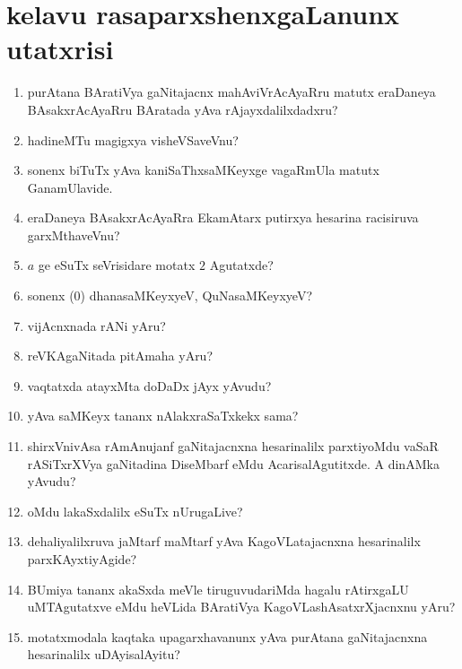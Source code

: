 \chapter{kelavu rasaparxshenxgaLanunx utatxrisi}\label{chap20}

\begin{enumerate}
  \renewcommand{\labelenumi}{\rm(\theenumi)}
    \itemsep=2pt
\item purAtana BAratiVya gaNitajacnx mahAviVrAcAyaRru matutx eraDaneya BAsakxrAcAyaRru BAratada yAva rAjayxdalilxdadxru?

\item hadineMTu magigxya visheVSaveVnu?

\item sonenx biTuTx yAva kaniSaThxsaMKeyxge vagaRmUla matutx GanamUlavide.

\item eraDaneya BAsakxrAcAyaRra EkamAtarx putirxya hesarina racisiruva garxMthaveVnu?
  
\item $a$ ge eSuTx seVrisidare motatx $2$ Agutatxde?
  
\item sonenx ($0$) dhanasaMKeyxyeV, QuNasaMKeyxyeV?
  
\item vijAcnxnada rANi yAru?
  
\item reVKAgaNitada pitAmaha yAru?
   
\item vaqtatxda atayxMta doDaDx jAyx yAvudu?
  
\item yAva saMKeyx tananx nAlakxraSaTxkekx sama?

\item shirxVnivAsa rAmAnujanf gaNitajacnxna hesarinalilx parxtiyoMdu vaSaR rASiTxrXVya gaNitadina DiseMbarf eMdu AcarisalAgutitxde. A dinAMka yAvudu?

\item oMdu lakaSxdalilx eSuTx nUrugaLive?
  
\item dehaliyalilxruva jaMtarf maMtarf yAva KagoVLatajacnxna hesarinalilx parxKAyxti\-yAgide?
  
\item BUmiya tananx akaSxda meVle tiruguvudariMda hagalu rAtirxgaLU uMTAgutatxve eMdu heVLida BAratiVya KagoVLashAsatxrXjacnxnu yAru?
  
\item motatxmodala kaqtaka upagarxhavanunx yAva purAtana gaNitajacnxna hesarinalilx uDAyisalAyitu?
  

\end{enumerate}
